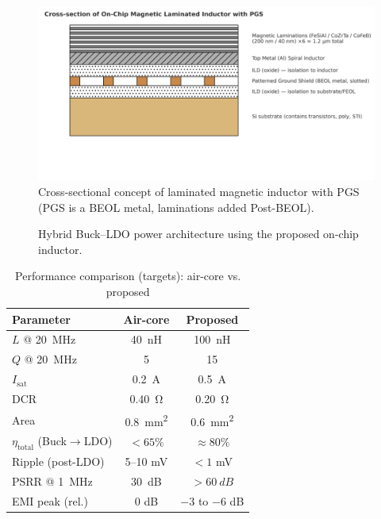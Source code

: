 \documentclass[journal]{IEEEtran}
\begin{document}
\begin{figure}[!t]
\centering
\includegraphics[width=0.8\linewidth]{fig/fig1_laminated_cross_section.png}
\caption{Cross-sectional concept of laminated magnetic inductor with PGS (PGS is a BEOL metal, laminations added Post-BEOL).}
\label{fig1}
\end{figure}

\begin{figure}[!t]
\centering
{}
\caption{Hybrid Buck--LDO power architecture using the proposed on-chip inductor.}
\label{fig2}
\end{figure}

\begin{table}[!t]
\centering
\caption{Performance comparison (targets): air-core vs. proposed}
\label{fig3}
\begin{tabular}{lcc}
\toprule
\textbf{Parameter} & \textbf{Air-core} & \textbf{Proposed} \\
\midrule
$L$ @ \SI{20}{MHz} & \SI{40}{nH} & \SI{100}{nH} \\
$Q$ @ \SI{20}{MHz} & 5 & 15 \\
$I_\mathrm{sat}$ & \SI{0.2}{A} & \SI{0.5}{A} \\
DCR & \SI{0.40}{\ohm} & \SI{0.20}{\ohm} \\
Area & \SI{0.8}{mm^2} & \SI{0.6}{mm^2} \\
$\eta_\mathrm{total}$ (Buck$\to$LDO) & $<65\%$ & $\approx80\%$ \\
Ripple (post-LDO) & 5--10 mV & $<1$ mV \\
PSRR @ \SI{1}{MHz} & \SI{30}{dB} & $>\SI{60}{dB}$ \\
EMI peak (rel.) & 0 dB & $-3$ to $-6$ dB \\
\bottomrule
\end{tabular}
\end{table}
\end{document}
